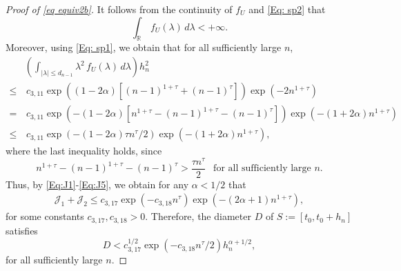 \documentclass[11pt, reqno]{amsart}
\numberwithin{equation}{section}
\newcommand{\1}{{\bf 1}}
\newcommand{\2}{{\bf 2}}
\begin{document}
\begin{proof}[Proof of \eqref{eq equiv2b}]
It follows from the continuity of $f_U$ and \eqref{Eq: sp2} 
that
\begin{equation}\label{Eq:J4}
\int_{\mathbb R} \,f_U(\lambda)\, d\lambda  <+\infty.
\end{equation}
Moreover, using  \eqref{Eq: sp1}, we  obtain that for all sufficiently large  $n$,
\begin{equation}\label{Eq:J5}
\begin{split}
& \left(\int_{|\lambda|\le d_{n-1}}  \lambda^2
\,f_U(\lambda)\, d\lambda \right)h_n^{2} \\ 
\le  &\, c_{3,11}  \exp\left((1-2\alpha)\left[(n-1)^{1+\tau}+(n-1)^{\tau}\right] \right)  \exp\left(-2n^{1+\tau} \right)\\
= &\,  c_{3,11}  \exp\left(-(1-2\alpha)\left[n^{1+\tau}-(n-1)^{1+\tau}-(n-1)^{\tau}\right] \right)  \exp\left(-(1+2\alpha)n^{1+\tau} \right)\\
\le &\,  c_{3,11}  \exp\left(-(1-2\alpha)\tau n^{\tau}/2 \right) \exp\left(-(1+2\alpha)n^{1+\tau} \right),
\end{split}
\end{equation} 
 {where the last inequality holds, since      }
$$ {
n^{1+\tau}-(n-1)^{1+\tau}-(n-1)^{\tau}>\frac{\tau n^{\tau}}{2}    \ \   \text{ for all sufficiently  large  } n. }
 $$
  Thus, by \eqref{Eq:J1}-\eqref{Eq:J5}, we obtain   for any $\alpha<1/2$ that 
\begin{align*}%
\mathcal J_1 +\mathcal J_2\le c_{3,17} \exp\left(- c_{3,18}n^{\tau}\right) \exp\left(-(2\alpha+1)n^{1+\tau}\right),
\end{align*}
for some constants $c_{3,17}, c_{3,18}>0$. Therefore,   the diameter $D$ of $S:=[t_0, t_0+h_n]$ satisfies 
 $$D< c_{3,17}^{1/2} \exp\left(- c_{3,18} n^{\tau}/2 \right)h_n^{\alpha+1/2}, $$
  for  all sufficiently large $n$.


\end{proof}
\end{document}

